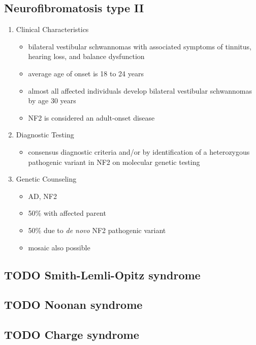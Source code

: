 \documentclass{scrartcl}
\begin{document}
\subsection{Neurofibromatosis type II}
\label{sec:org3f7730b}
\begin{enumerate}
\item Clinical Characteristics
\label{sec:orgb42ac89}
\begin{itemize}
\item bilateral vestibular schwannomas with associated symptoms of tinnitus, hearing loss, and balance dysfunction
\item average age of onset is 18 to 24 years
\item almost all affected individuals develop bilateral vestibular
schwannomas by age 30 years
\item NF2 is considered an adult-onset disease
\end{itemize}
\item Diagnostic Testing
\label{sec:org9d3c392}
\begin{itemize}
\item consensus diagnostic criteria and/or by identification of a
heterozygous pathogenic variant in NF2 on molecular genetic testing
\end{itemize}

\item Genetic Counseling
\label{sec:orgb23e247}
\begin{itemize}
\item AD, NF2
\item 50\% with affected parent
\item 50\% due to \emph{de novo} NF2 pathogenic variant
\item mosaic also possible
\end{itemize}
\end{enumerate}
\subsection{{\bfseries\sffamily TODO} Smith-Lemli-Opitz syndrome}
\label{sec:org6475266}
\subsection{{\bfseries\sffamily TODO} Noonan syndrome}
\label{sec:org7221663}
\subsection{{\bfseries\sffamily TODO} Charge syndrome}
\label{sec:orgb40d55f}
\end{document}
